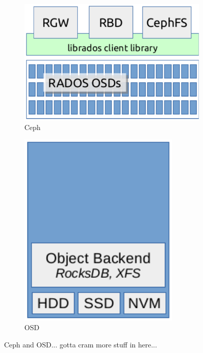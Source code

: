 \documentclass[10pt,twocolumn]{article}
\begin{document}
\begin{figure}[t]
  \centering
  \begin{subfigure}[b]{.48\linewidth}
      \centering
      \includegraphics[width=1.0\linewidth]{figures/ceph}
      \caption{Ceph}
      \label{fig:ceph}
  \end{subfigure}\quad
  \begin{subfigure}[b]{.40\linewidth}
      \centering
      \includegraphics[width=1.0\linewidth]{figures/osd}
      \caption{OSD}
      \label{fig:osd}
  \end{subfigure}
  \caption{Ceph and OSD... gotta cram more stuff in here...}
\end{figure}
\end{document}
